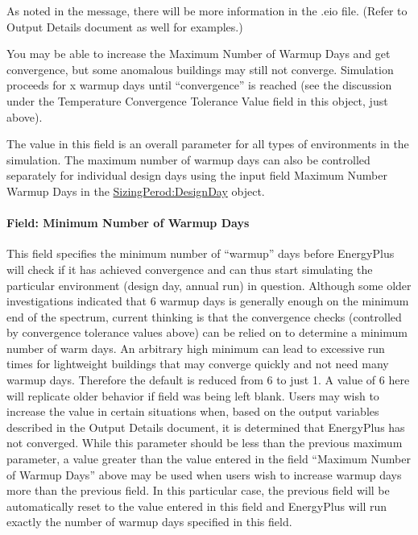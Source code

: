 As noted in the message, there will be more information in the .eio file. (Refer to Output Details document as well for examples.)

You may be able to increase the Maximum Number of Warmup Days and get convergence, but some anomalous buildings may still not converge. Simulation proceeds for x warmup days until ``convergence'' is reached (see the discussion under the Temperature Convergence Tolerance Value field in this object, just above).

The value in this field is an overall parameter for all types of environments in the simulation. The maximum number of warmup days can also be controlled separately for individual design days using the input field Maximum Number Warmup Days in the \hyperref[sizingperioddesignday]{SizingPerod:DesignDay} object.

\paragraph{Field: Minimum Number of Warmup Days}\label{field-minimum-number-of-warmup-days}

This field specifies the minimum number of ``warmup'' days before EnergyPlus will check if it has achieved convergence and can thus start simulating the particular environment (design day, annual run) in question. Although some older investigations indicated that 6 warmup days is generally enough on the minimum end of the spectrum, current thinking is that the convergence checks (controlled by convergence tolerance values above) can be relied on to determine a minimum number of warm days. An arbitrary high minimum can lead to excessive run times for lightweight buildings that may converge quickly and not need many warmup days. Therefore the default is reduced from 6 to just 1. A value of 6 here will replicate older behavior if field was being left blank. Users may wish to increase the value in certain situations when, based on the output variables described in the Output Details document, it is determined that EnergyPlus has not converged. While this parameter should be less than the previous maximum parameter, a value greater than the value entered in the field ``Maximum Number of Warmup Days'' above may be used when users wish to increase warmup days more than the previous field. In this particular case, the previous field will be automatically reset to the value entered in this field and EnergyPlus will run exactly the number of warmup days specified in this field.

